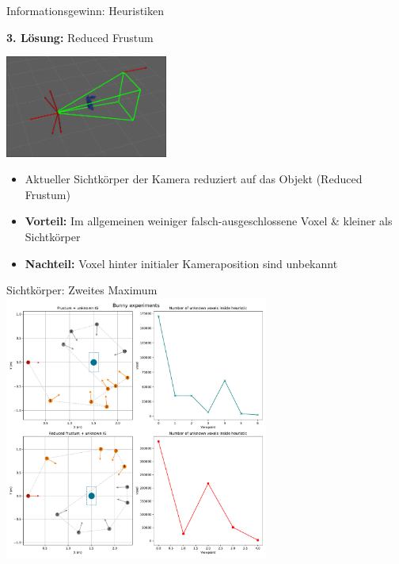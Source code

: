 \documentclass{beamer}
\begin{document}
\begin{frame}{Informationsgewinn: Heuristiken}
	\begin{block}{\textbf{3. Lösung:} Reduced Frustum}
		\begin{center}
			\includegraphics[width=0.4\textwidth]{Graphics/reduced_frustum.png}
		\end{center}
		\begin{itemize}
			\item Aktueller Sichtkörper der Kamera reduziert auf das Objekt (Reduced Frustum)
			\item \textbf{Vorteil:} Im allgemeinen weiniger falsch-ausgeschlossene Voxel \& kleiner als Sichtkörper
			\item \textbf{Nachteil:} Voxel hinter initialer Kameraposition sind unbekannt
		\end{itemize}
	\end{block}
\end{frame}

\begin{frame}{Sichtkörper: Zweites Maximum}
	\center
	\includegraphics[width=0.65\textwidth]{Graphics/bunny_views_unknown_voxels.pdf}
\end{frame}
\end{document}
